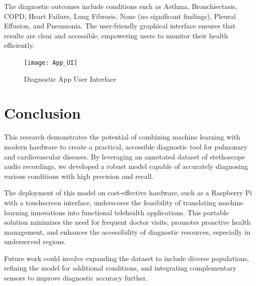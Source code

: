 \documentclass[twocolumn]{article}
\begin{document}
The diagnostic outcomes include conditions such as Asthma, Bronchiectasis, COPD, Heart Failure, Lung Fibrosis, None (no significant findings), Pleural Effusion, and Pneumonia. The user-friendly graphical interface ensures that results are clear and accessible, empowering users to monitor their health efficiently.

 \begin{figure}[h]
  \centering
  \texttt{[image: App\_UI]}
  \caption{Diagnostic App User Interface}
  \label{fig:App_UI}
\end{figure}

\section{Conclusion}
This research demonstrates the potential of combining machine learning with modern 
hardware to create a practical, accessible diagnostic tool for pulmonary and 
cardiovascular diseases. By leveraging an annotated dataset of stethoscope audio recordings, 
we developed a robust model capable of accurately diagnosing various conditions with high precision and recall. 

The deployment of this model on cost-effective hardware, such as a 
Raspberry Pi with a touchscreen interface, underscores the feasibility of translating 
machine learning innovations into functional telehealth applications. This portable solution minimizes 
the need for frequent doctor visits, promotes proactive health management, and 
enhances the accessibility of diagnostic resources, especially in underserved regions.

Future work could involve expanding the dataset to include diverse populations, 
refining the model for additional conditions, and integrating complementary sensors to 
improve diagnostic accuracy further. 
\end{document}
